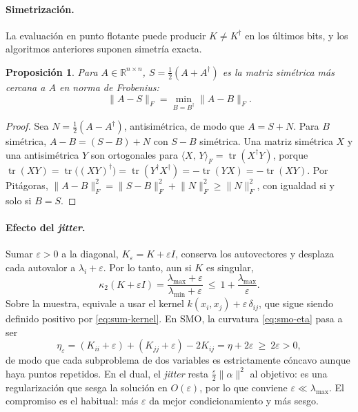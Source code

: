 \documentclass[11pt,a4paper]{article}
\newcommand{\R}{\mathbb{R}}
\newcommand{\dg}{\dagger}                         %
\newcommand{\inner}[2]{\langle #1,\, #2\rangle}
\newcommand{\norm}[1]{\lVert #1\rVert}
\DeclareMathOperator{\tr}{tr}
\theoremstyle{plain}
\newtheorem{proposicion}[teorema]{Proposición}
\theoremstyle{definition}
\theoremstyle{remark}
\numberwithin{equation}{section}
\begin{document}
\paragraph{Simetrización.} La evaluación en punto flotante puede producir $K\ne K^{\dg}$ en
los últimos bits, y los algoritmos anteriores suponen simetría exacta.
\begin{proposicion}
Para $A\in\R^{n\times n}$, $S=\frac12(A+A^{\dg})$ es la matriz simétrica más cercana a $A$ en
norma de Frobenius:
\begin{equation}\label{eq:symmetrization}
  \norm{A-S}_F=\min_{B=B^{\dg}}\norm{A-B}_F .
\end{equation}
\end{proposicion}
\begin{proof}
Sea $N=\frac12(A-A^{\dg})$, antisimétrica, de modo que $A=S+N$. Para $B$ simétrica,
$A-B=(S-B)+N$ con $S-B$ simétrica. Una matriz simétrica $X$ y una antisimétrica $Y$ son
ortogonales para $\inner XY_F=\tr(X^{\dg}Y)$, porque
$\tr(XY)=\tr\bigl((XY)^{\dg}\bigr)=\tr(Y^{\dg}X^{\dg})=-\tr(YX)=-\tr(XY)$. Por Pitágoras,
$\norm{A-B}_F^2=\norm{S-B}_F^2+\norm N_F^2\ge\norm N_F^2$, con igualdad si y solo si $B=S$.
\end{proof}

\paragraph{Efecto del \emph{jitter}.} Sumar $\varepsilon>0$ a la diagonal,
$K_\varepsilon=K+\varepsilon I$, conserva los autovectores y desplaza cada autovalor a
$\lambda_i+\varepsilon$. Por lo tanto, aun si $K$ es singular,
\begin{equation}\label{eq:jitter-cond}
  \kappa_2(K+\varepsilon I)=\frac{\lambda_{\max}+\varepsilon}{\lambda_{\min}+\varepsilon}
  \ \le\ 1+\frac{\lambda_{\max}}{\varepsilon} .
\end{equation}
Sobre la muestra, equivale a usar el kernel $k(x_i,x_j)+\varepsilon\,\delta_{ij}$, que sigue
siendo definido positivo por \eqref{eq:sum-kernel}. En SMO, la curvatura \eqref{eq:smo-eta}
pasa a ser
\begin{equation}\label{eq:jitter-eta}
  \eta_\varepsilon=(K_{ii}+\varepsilon)+(K_{jj}+\varepsilon)-2K_{ij}=\eta+2\varepsilon\ \ge\ 2\varepsilon>0,
\end{equation}
de modo que cada subproblema de dos variables es estrictamente cóncavo aunque haya puntos
repetidos. En el dual, el \emph{jitter} resta $\frac\varepsilon2\norm\alpha^2$ al objetivo: es
una regularización que sesga la solución en $O(\varepsilon)$, por lo que conviene
$\varepsilon\ll\lambda_{\max}$. El compromiso es el habitual: más $\varepsilon$ da mejor
condicionamiento y más sesgo.
\end{document}
